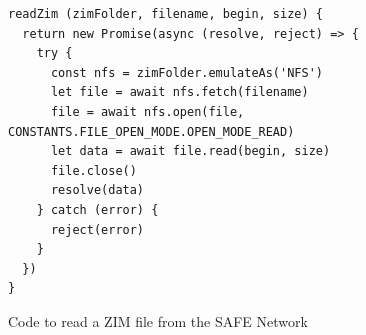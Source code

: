 \begin{figure}[h]
\begin{lstlisting}[frame=single]
readZim (zimFolder, filename, begin, size) {
  return new Promise(async (resolve, reject) => {
    try {
      const nfs = zimFolder.emulateAs('NFS')
      let file = await nfs.fetch(filename)
      file = await nfs.open(file, CONSTANTS.FILE_OPEN_MODE.OPEN_MODE_READ)
      let data = await file.read(begin, size)
      file.close()
      resolve(data)
    } catch (error) {
      reject(error)
    }
  })
}
\end{lstlisting}
\caption{Code to read a ZIM file from the SAFE Network}
\label{fig:zim-read-code}
\end{figure}










